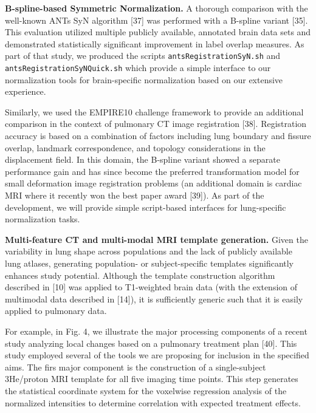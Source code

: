 \documentclass[11pt,]{article}
\begin{document}
\textbf{B-spline-based Symmetric Normalization.} A thorough comparison
with the well-known ANTs SyN algorithm {[}37{]} was performed with a
B-spline variant {[}35{]}. This evaluation utilized multiple publicly
available, annotated brain data sets and demonstrated statistically
significant improvement in label overlap measures. As part of that
study, we produced the scripts \texttt{antsRegistrationSyN.sh} and
\texttt{antsRegistrationSyNQuick.sh} which provide a simple interface to
our normalization tools for brain-specific normalization based on our
extensive experience.

Similarly, we used the EMPIRE10 challenge framework to provide an
additional comparison in the context of pulmonary CT image registration
{[}38{]}. Registration accuracy is based on a combination of factors
including lung boundary and fissure overlap, landmark correspondence,
and topology considerations in the displacement field. In this domain,
the B-spline variant showed a separate performance gain and has since
become the preferred transformation model for small deformation image
registration problems (an additional domain is cardiac MRI where it
recently won the best paper award {[}39{]}). As part of the development,
we will provide simple script-based interfaces for lung-specific
normalization tasks.

\textbf{Multi-feature CT and multi-modal MRI template generation.} Given
the variability in lung shape across populations and the lack of
publicly available lung atlases, generating population- or
subject-specific templates significantly enhances study potential.
Although the template construction algorithm described in {[}10{]} was
applied to T1-weighted brain data (with the extension of multimodal data
described in {[}14{]}), it is sufficiently generic such that it is
easily applied to pulmonary data.

For example, in Fig. 4, we illustrate the major processing components of
a recent study analyzing local changes based on a pulmonary treatment
plan {[}40{]}. This study employed several of the tools we are proposing
for inclusion in the specified aims. The firs major component is the
construction of a single-subject 3He/proton MRI template for all five
imaging time points. This step generates the statistical coordinate
system for the voxelwise regression analysis of the normalized
intensities to determine correlation with expected treatment effects.
\end{document}
